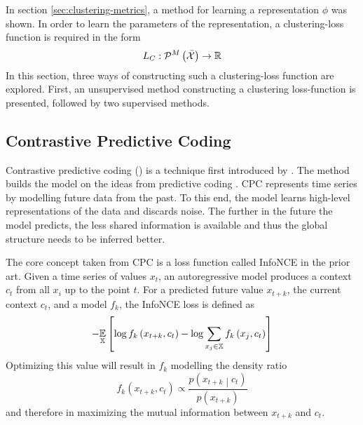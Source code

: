 In section \ref{sec:clustering-metrics}, a method for learning a representation \( \phi \) was shown. In order to learn the parameters of the representation, a clustering-loss function is required in the form
\[ L_C : \mathcal{P}^M \left( \bar{\mathcal{X}} \right) \to \mathbb{R} \]
In this section, three ways of constructing such a clustering-loss function are explored. First, an unsupervised method constructing a clustering loss-function is presented, followed by two supervised methods.

\subsection{Contrastive Predictive Coding}
Contrastive predictive coding () is a technique first introduced by \cite{oord_representation_2019}. The method builds the model on the ideas from predictive coding \cite{elias_predictive_1955}. CPC represents time series by modelling future data from the past. To this end, the model learns high-level representations of the data and discards noise. The further in the future the model predicts, the less shared information is available and thus the global structure needs to be inferred better.

The core concept taken from CPC is a loss function called InfoNCE in the prior art. Given a time series of values \( x_t \), an autoregressive model produces a context \( c_t \) from all \( x_i \) up to the point \( t \). For a predicted future value \( x_{t + k} \), the current context \( c_t \), and a model \( f_k \), the InfoNCE loss is defined as
\[ - \underset{\mathbb{X}}{\mathbb{E}} \left[ \log f_k \left( x_{t + k}, c_t \right) - \log \sum_{x_j \in \mathbb{X}} f_k \left( x_j, c_t \right) \right] \]
Optimizing this	value will result in \( f_k \) modelling the density ratio
\[ f_k \left( x_{t + k}, c_t \right) \propto \frac{p \left( x_{t + k} \middle| c_t \right)}{p \left( x_{t + k} \right)} \]
and therefore in maximizing the mutual information between \( x_{t + k} \) and \( c_t \).

